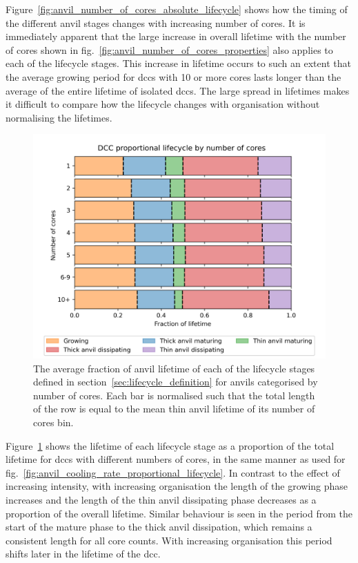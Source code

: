 Figure~\ref{fig:anvil_number_of_cores_absolute_lifecycle} shows how the timing of the different anvil stages changes with increasing number of cores.
It is immediately apparent that the large increase in overall lifetime with the number of cores shown in fig.~\ref{fig:anvil_number_of_cores_properties} also applies to each of the lifecycle stages.
This increase in lifetime occurs to such an extent that the average growing period for \acrshort{dcc}s with 10 or more cores lasts longer than the average of the entire lifetime of isolated \acrshort{dcc}s.
The large spread in lifetimes makes it difficult to compare how the lifecycle changes with organisation without normalising the lifetimes.

\begin{figure}[tp]
    \centering
    \includegraphics[width=\textwidth]{figures/chapter3_12.png}
    \caption[
    The average fraction of anvil lifetime of each lifecycle stage for anvils categorised by number of cores
    ]{
    The average fraction of anvil lifetime of each of the lifecycle stages defined in section~\ref{sec:lifecycle_definition} for anvils categorised by number of cores. Each bar is normalised such that the total length of the row is equal to the mean thin anvil lifetime of its number of cores bin.
    }
    \label{fig:anvil_number_of_cores_proportional_lifecycle}
\end{figure}

Figure~\ref{fig:anvil_number_of_cores_proportional_lifecycle} shows the lifetime of each lifecycle stage as a proportion of the total lifetime for \acrshort{dcc}s with different numbers of cores, in the same manner as used for fig.~\ref{fig:anvil_cooling_rate_proportional_lifecycle}.
In contrast to the effect of increasing intensity, with increasing organisation the length of the growing phase increases and the length of the thin anvil dissipating phase decreases as a proportion of the overall lifetime.
Similar behaviour is seen in the period from the start of the mature phase to the thick anvil dissipation, which remains a consistent length for all core counts.
With increasing organisation this period shifts later in the lifetime of the \acrshort{dcc}.

